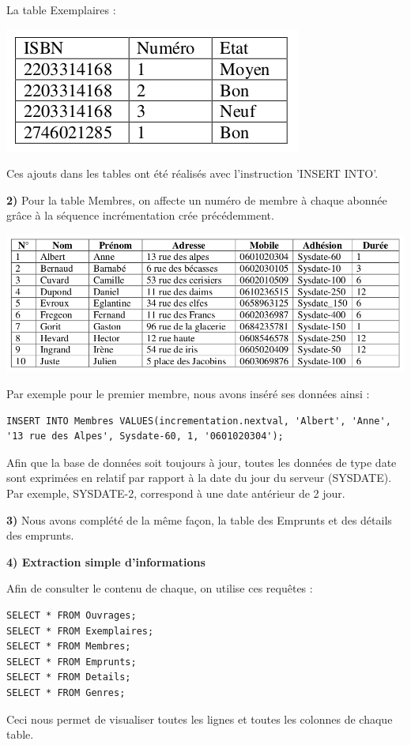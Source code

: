 \documentclass[a4paper,12pt]{article}
\begin{document}
La table Exemplaires : 
\begin{center}
    \includegraphics[scale=0.5]{exemplaire.png}
\end{center}

Ces ajouts dans les tables ont été réalisés avec l'instruction 'INSERT INTO'.

\clearpage
\textbf {2) } Pour la table Membres, on affecte un numéro de membre à chaque abonnée grâce à la séquence incrémentation crée précédemment.

\begin{center}
    \includegraphics[scale=0.5]{membres.png}
\end{center}
 Par exemple pour le premier membre, nous avons inséré ses données ainsi : 
 \begin{lstlisting}
INSERT INTO Membres VALUES(incrementation.nextval, 'Albert', 'Anne', '13 rue des Alpes', Sysdate-60, 1, '0601020304');
  \end{lstlisting}
 
 Afin que la base de données soit toujours à jour, toutes les données de type date sont exprimées en relatif par rapport à la date du jour du serveur (SYSDATE). Par exemple, SYSDATE-2, correspond à une date antérieur de 2 jour.
 
 \textbf {3) } Nous avons complété de la même façon, la table des Emprunts et des détails des emprunts. 
 
  \textbf {4) Extraction simple d’informations }

Afin de consulter le contenu de chaque, on utilise ces requêtes : 
\begin{lstlisting}
SELECT * FROM Ouvrages;
SELECT * FROM Exemplaires;
SELECT * FROM Membres;
SELECT * FROM Emprunts;
SELECT * FROM Details;
SELECT * FROM Genres;
  \end{lstlisting}
Ceci nous permet de visualiser toutes les lignes et toutes les colonnes de chaque table. 
\end{document}
